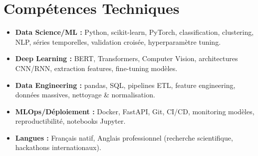 \documentclass[a4paper,11pt]{article}
\begin{document}
\section{Comp\'etences Techniques}
\begin{itemize}[leftmargin=*, label=\tiny$\bullet$, nosep]
    \item \textbf{Data Science/ML :} Python, scikit-learn, PyTorch, classification, clustering, NLP, s\'eries temporelles, validation crois\'ee, hyperparamètre tuning.
    \item \textbf{Deep Learning :} BERT, Transformers, Computer Vision, architectures CNN/RNN, extraction features, fine-tuning mod\`eles.
    \item \textbf{Data Engineering :} pandas, SQL, pipelines ETL, feature engineering, donn\'ees massives, nettoyage \& normalisation.
    \item \textbf{MLOps/Déploiement :} Docker, FastAPI, Git, CI/CD, monitoring mod\`eles, reproductibilit\'e, notebooks Jupyter.
    \item \textbf{Langues :} Fran\c{c}ais natif, Anglais professionnel (recherche scientifique, hackathons internationaux).
\end{itemize}
\end{document}
